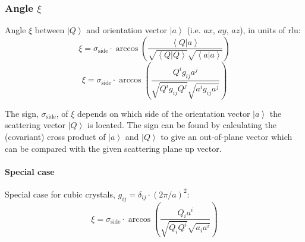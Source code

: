 \subsubsection*{Angle $\xi$}
Angle $\xi$ between $\left| Q \right>$ and orientation vector $\left| a \right>$ (i.e. $ax$, $ay$, $az$), in units of rlu:
\begin{equation} \xi = \sigma_{\mathrm{side}} \cdot \arccos \left( \frac{ \left< Q | a \right> }{ \sqrt{\left< Q | Q \right>} \sqrt{\left< a | a \right>} } \right) \end{equation}
\begin{equation} \boxed{ \xi = \sigma_{\mathrm{side}} \cdot \arccos \left( \frac{ Q^i g_{ij} a^j }{ \sqrt{Q^i g_{ij} Q^j} \sqrt{a^i g_{ij} a^j} } \right) } \end{equation}

The sign, $\sigma_{\mathrm{side}}$, of $\xi$ depends on which side of the orientation vector $\left| a \right>$ the scattering vector $\left| Q \right>$ 
is located. The sign can be found by calculating the (covariant) cross product of $\left| a \right>$ and $\left| Q \right>$ to give an out-of-plane vector 
which can be compared with the given scattering plane up vector.


\paragraph*{Special case}
Special case for cubic crystals, $g_{ij} = \delta_{ij} \cdot \left( 2\pi / a \right)^2$:
\begin{equation} \xi = \sigma_{\mathrm{side}} \cdot \arccos \left( \frac{ Q_i a^i }{ \sqrt{Q_i Q^i} \sqrt{a_i a^i} } \right) \end{equation}

